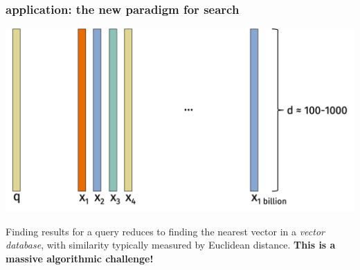 \documentclass[compress]{beamer}
\begin{document}
\begin{frame}
	\frametitle{application: the new paradigm for search}
	\begin{center}
		\vspace{-.5em}
				\includegraphics[width=.8\textwidth]{vector_database.png}
				\vspace{-.5em}
	\end{center}
	Finding results for a query reduces to finding the nearest vector in a \emph{vector database}, with similarity typically measured by Euclidean distance. \textbf{This is a massive algorithmic challenge!}
\end{frame}
\end{document}
